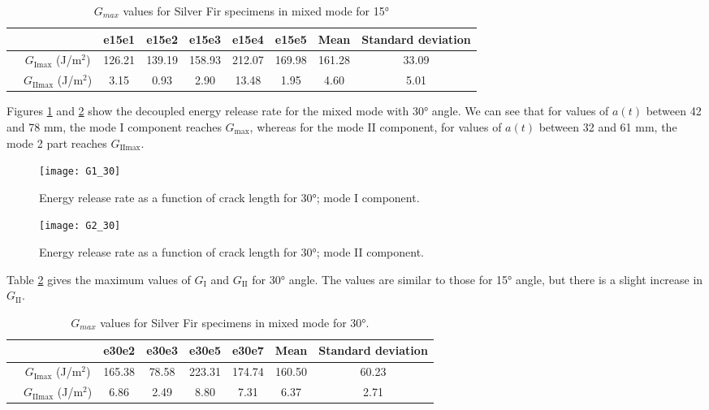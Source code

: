 \begin{table} [H]
	\centering
	\begin{tabular}{ccccccccc}
		\toprule %
		&  & e15e1 & e15e2 & e15e3 & e15e4 & e15e5 & Mean & Standard deviation\\\midrule
		& $G_\text{Imax}$ (J/m$^2$) & 126.21 & 139.19 & 158.93 & 212.07 & 169.98 & 161.28 & 33.09 \\
		& $G_\text{IImax}$ (J/m$^2$) & 3.15 & 0.93 & 2.90 & 13.48 & 1.95 & 4.60 & 5.01\\\bottomrule
	\end{tabular}
	\caption{$G_{max}$ values for Silver Fir specimens in mixed mode for 15°}
	\label{fig:tableG15}
\end{table}

Figures \ref{fig:G1_30} and \ref{fig:G2_30} show the decoupled energy release rate for the mixed mode with 30° angle. We can see that for values of $a(t)$ between 42 and 78 mm, the mode I component reaches $G_\text{max}$, whereas for the mode II component, for values of $a(t)$ between 32 and 61 mm, the mode 2 part reaches $G_\text{IImax}$.

\begin{figure}[htp]
	\centering
	\texttt{[image: G1\_30]}
	\caption{Energy release rate as a function of crack length for 30°; mode I component.}
	\label{fig:G1_30}
\end{figure}


\begin{figure}[htp]
	\centering
	\texttt{[image: G2\_30]}
	\caption{Energy release rate as a function of crack length for 30°; mode II component.}
	\label{fig:G2_30}
\end{figure}

Table \ref{fig:tableG30} gives the maximum values of $G_\text{I}$ and $G_\text{II}$ for 30° angle. The values are similar to those for 15° angle, but there is a slight increase in $G_\text{II}$.

\begin{table} [H]
	\centering
	\begin{tabular}{cccccccc}
		\toprule %
		&  & e30e2 & e30e3 & e30e5 & e30e7 & Mean & Standard deviation\\\midrule
		& $G_\text{Imax}$ (J/m$^2$)  & 165.38 & 78.58 & 223.31 & 174.74 & 160.50 & 60.23 \\
		& $G_\text{IImax}$ (J/m$^2$) & 6.86 & 2.49 & 8.80 & 7.31 & 6.37 & 2.71\\\bottomrule
	\end{tabular}
	\caption{$G_{max}$ values for Silver Fir specimens in mixed mode for 30°.}
	\label{fig:tableG30}
\end{table}

